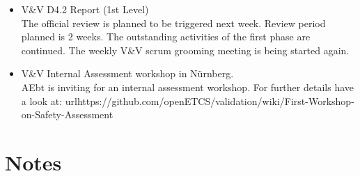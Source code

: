 \documentclass[a4paper, 11pt]{article}
\begin{document}
\begin{itemize}
\item V\&V D4.2 Report (1st Level)\\
The official review is planned to be triggered next week. Review period planned is 2 weeks. The outstanding activities of the first phase are continued. The weekly V\&V scrum grooming meeting is being started again.
 
\item V\&V Internal Assessment workshop in N\"urnberg.\\
AEbt is inviting for an internal assessment workshop. For further details have a look at: url{https://github.com/openETCS/validation/wiki/First-Workshop-on-Safety-Assessment}

\end{itemize}


\section{Notes}
\end{document}

